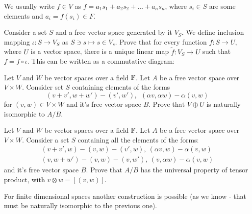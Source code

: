 We usually write $f\in V$ as $f=a_1s_1 + a_2s_2+\dots+a_ns_n$, where $s_i\in S$ are some elements and $a_i=f(s_i)\in F$.

\begin{prob}
  Consider a set $S$ and a free vector space generated by it $V_S$. We define inclusion mapping $\iota : S\to V_S$ as $S\ni s \mapsto s\in V_s$. Prove that for every function
  $f: S\to U$, where $U$ is a vector space, there is a unique linear map $\tilde f: V_S\to U$ such that $f=f\circ \iota$. This can be written as a commutative diagram:

  \begin{figure}
    \centering
  \end{figure}
\end{prob}

\begin{prob}
  Let $V$ and $W$ be vector spaces over a field $\mathbb F$. Let $A$ be a free vector space over $V\times W$.
  Consider set $S$ containing elements of the forms
  $$(v+v',w+w')-(v', w'),~~(\alpha v, \alpha w)-\alpha (v,w)$$
  for $(v,w) \in V\times W$ and it's free vector space $B$.
  Prove that $V\oplus U$ is naturally isomorphic to $A/B$.
\end{prob}

\begin{prob}
  Let $V$ and $W$ be vector spaces over a field $\mathbb F$. Let $A$ be a free vector space over $V\times W$. Consider a set $S$ containing all the elements of the forms:
  \begin{align}
    (v+v',w)-(v,w)-(v',w),~(\alpha v, w)-\alpha(v,w)\\
    (v,w+w')-(v,w)-(v,w'),~(v, \alpha w)-\alpha(v,w)
  \end{align}
  and it's free vector space $B$. Prove that $A/B$ has the universal property of tensor product, with $v\otimes w = [(v,w)]$.
\end{prob}

For finite dimensional spaces another construction is possible (as we know - that must be naturally isomorphic to the previous one).

